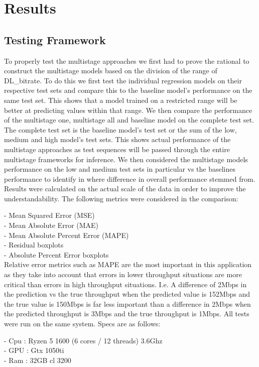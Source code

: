 \chapter{Results}
\label{chp:experiments} 
\section{Testing Framework}
To properly test the multistage approaches we first had to prove the rational to construct the multistage models based on the division of the range of DL\_bitrate. To do this we first test the individual regression models on their respective test sets and compare this to the baseline model's performance on the same test set. This shows that a model trained on a restricted range will be better at predicting values within that range. We then compare the performance of the multistage one, multistage all and baseline model on the complete test set. The complete test set is the baseline model's test set or the sum of the low, medium and high model's test sets. This shows actual performance of the multistage approaches as test sequences will be passed through the entire multistage frameworks for inference. We then considered the multistage models performance on the low and medium test sets in particular vs the baselines performance to identify in where difference in overall performance stemmed from. Results were calculated on the actual scale of the data in order to improve the understandability. The following metrics were considered in the comparison:

- Mean Squared Error (MSE)\\
- Mean Absolute Error (MAE)\\
- Mean Absolute Percent Error (MAPE)\\
- Residual boxplots \\ 
- Absolute Percent Error boxplots \\

Relative error metrics such as MAPE are the most important in this application as they take into account that errors in lower throughput situations are more critical than errors in high throughput situations. I.e. A difference of 2Mbps in the prediction vs the true throughput when the predicted value is 152Mbps and the true value is 150Mbps is far less important than a difference in 2Mbps when the predicted throughput is 3Mbps and the true throughput is 1Mbps. All tests were run on the same system. Specs are as follows:

- Cpu : Ryzen 5 1600 (6 cores / 12 threads) \@ 3.6Ghz \\
- GPU : Gtx 1050ti \\
- Ram : 32GB cl 3200 \\

